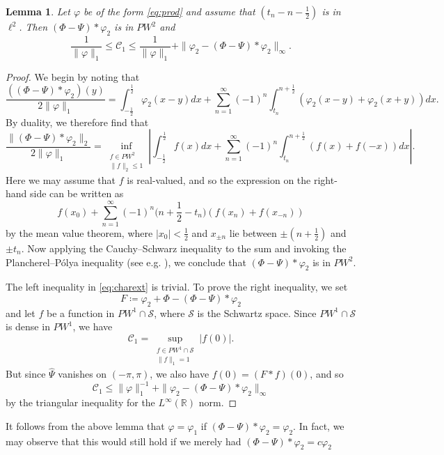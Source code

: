 \documentclass[12pt]{amsart}
\theoremstyle{plain}
\newtheorem{lemma}{Lemma}
\begin{document}
\begin{lemma} Let $\varphi$ be of the form \eqref{eq:prod} and assume that $(t_n-n-\frac12)$ is in $\ell^2$. Then $(\Phi-\Psi)\ast \varphi_2$ is in $PW^2$ and
\begin{equation} \label{eq:charext}  \frac{1}{\|\varphi \|_{1}}  \le \mathscr{C}_1 \le \frac{1}{\|\varphi \|_{1}} + \| \varphi_2 -(\Phi-\Psi)\ast \varphi_2 \|_{\infty}.  \end{equation}  \end{lemma}
\begin{proof} We begin by noting that
\[ \frac{((\Phi-\Psi)\ast \varphi_2)(y)}{2\|\varphi\|_{1}}= \int_{-\frac{1}{2}}^{\frac{1}{2}} \varphi_2(x-y) dx + \sum_{n=1}^{\infty} (-1)^n \int_{t_n}^{n+\frac{1}{2}} \left( \varphi_2(x-y) + \varphi_2(x+y)\right) dx. \]
By duality, we therefore find that
\[ \frac{\|(\Phi-\Psi)\ast \varphi_2\|_{2}}{2\|\varphi\|_{1}}
=\inf_{\substack{f\in PW^2\\ \|f\|_2\le 1}} \left| \int_{-\frac{1}{2}}^{\frac{1}{2}} f(x)dx + \sum_{n=1}^{\infty} (-1)^n \int_{t_n}^{n+\frac{1}{2}} \left(f(x)+f(-x)\right) dx\right|. \]
Here we may assume that $f$ is real-valued, and so the expression on the right-hand side can be written as 
\[ f(x_0)+ \sum_{n=1}^{\infty} (-1)^n \big(n+\frac{1}{2}-t_n\big)\left(f(x_n) + f(x_{-n})\right) \]
by the mean value theorem, where $|x_0| < \frac12$ and $x_{\pm n}$ lie between $\pm(n+\frac12)$ and $\pm t_n$. Now 
applying the Cauchy--Schwarz inequality to the sum and invoking the Plancherel--P\'{o}lya inequality (see e.g. \cite[Lect. 7]{Levin96}), we conclude that $(\Phi-\Psi)\ast \varphi_2$ is in $PW^2$.

The left inequality in \eqref{eq:charext} is trivial. To prove the right inequality, we set
\[ F\coloneqq \varphi_2 + \Phi - (\Phi-\Psi)\ast \varphi_2 \]
and let $f$ be a function in $PW^1\cap \mathscr{S}$, where $\mathscr{S}$ is the Schwartz space. Since $PW^1\cap \mathscr{S}$ is dense in $PW^1$, we have 
\[ \mathscr{C}_1=\sup_{\substack{f\in PW^1\cap \mathscr S\\ \| f\|_{1}=1}} |f(0)|. \]
But since $\widehat{\Psi}$ vanishes on $(-\pi,\pi)$, we also have $f(0)=(F\ast f)(0)$, and so
\[ \mathscr{C}_1 \le \| \varphi\|_1^{-1} +  \| \varphi_2 -(\Phi-\Psi)\ast \varphi_2 \|_{\infty} \]
by the triangular inequality for the $L^\infty(\mathbb R)$ norm.
\end{proof}
It follows from the above lemma that $\varphi=\varphi_1$ if $(\Phi-\Psi)\ast \varphi_2=\varphi_2$. In fact, we may observe that this would still hold if we merely had $(\Phi-\Psi)\ast \varphi_2=c\varphi_2$
\end{document}
